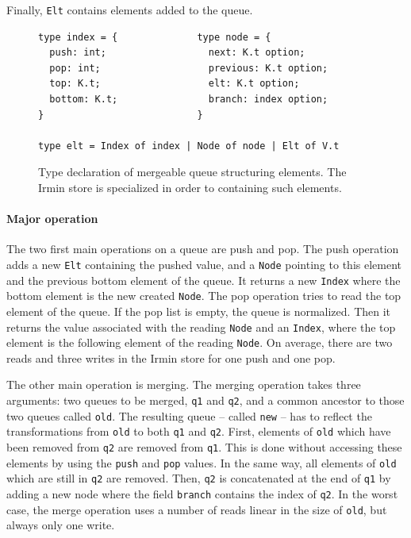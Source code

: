 \documentclass{article}
\newcommand{\irmin}{Irmin\xspace}
\newcommand{\code}[1]{\texttt{#1}}
\begin{document}
Finally, \code{Elt} contains elements added to the queue.

\begin{figure}[hbt]
%
\begin{lstlisting}
type index = {              type node = {
  push: int;                  next: K.t option;
  pop: int;                   previous: K.t option;
  top: K.t;                   elt: K.t option;
  bottom: K.t;                branch: index option;
}                           }

type elt = Index of index | Node of node | Elt of V.t
\end{lstlisting}
\caption{Type declaration of mergeable queue structuring elements. The \irmin store is specialized in order to containing such elements.}
\label{queuesig}
\end{figure}

\paragraph{Major operation}
The two first main operations on a queue are push and pop.
The push operation adds a new \code{Elt} containing the pushed value, and a \code{Node} pointing to this element and the previous bottom element of the queue.
It returns a new \code{Index} where the bottom element is the new created \code{Node}.
The pop operation tries to read the top element of the queue.
If the pop list is empty, the queue is normalized.
Then it returns the value associated with the reading \code{Node} and an \code{Index}, where the top element is the following element of the reading \code{Node}.
On average, there are two reads and three writes in the \irmin store for one push and one pop.

The other main operation is merging.
The merging operation takes three arguments: two queues to be merged, \code{q1} and \code{q2}, and a common ancestor to those two queues called \code{old}.
The resulting queue -- called \code{new} -- has to reflect the transformations from \code{old} to both \code{q1} and \code{q2}.
First, elements of \code{old} which have been removed from \code{q2} are removed from \code{q1}.
This is done without accessing these elements by using the \code{push} and \code{pop} values.
In the same way, all elements of \code{old} which are still in \code{q2} are removed.
Then, \code{q2} is concatenated at the end of \code{q1} by adding a new node where the field \code{branch} contains the index of \code{q2}.
In the worst case, the merge operation uses a number of reads linear in the size of \code{old}, but always only one write.
\end{document}
